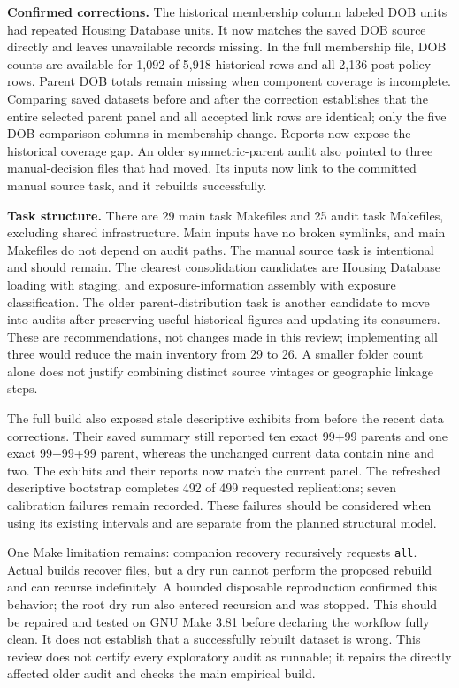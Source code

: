 \textbf{Confirmed corrections.} The historical membership column labeled DOB units had repeated Housing Database units. It now matches the saved DOB source directly and leaves unavailable records missing. In the full membership file, DOB counts are available for 1,092 of 5,918 historical rows and all 2,136 post-policy rows. Parent DOB totals remain missing when component coverage is incomplete. Comparing saved datasets before and after the correction establishes that the entire selected parent panel and all accepted link rows are identical; only the five DOB-comparison columns in membership change. Reports now expose the historical coverage gap. An older symmetric-parent audit also pointed to three manual-decision files that had moved. Its inputs now link to the committed manual source task, and it rebuilds successfully.

\textbf{Task structure.} There are 29 main task Makefiles and 25 audit task Makefiles, excluding shared infrastructure. Main inputs have no broken symlinks, and main Makefiles do not depend on audit paths. The manual source task is intentional and should remain. The clearest consolidation candidates are Housing Database loading with staging, and exposure-information assembly with exposure classification. The older parent-distribution task is another candidate to move into audits after preserving useful historical figures and updating its consumers. These are recommendations, not changes made in this review; implementing all three would reduce the main inventory from 29 to 26. A smaller folder count alone does not justify combining distinct source vintages or geographic linkage steps.

The full build also exposed stale descriptive exhibits from before the recent data corrections. Their saved summary still reported ten exact 99+99 parents and one exact 99+99+99 parent, whereas the unchanged current data contain nine and two. The exhibits and their reports now match the current panel. The refreshed descriptive bootstrap completes 492 of 499 requested replications; seven calibration failures remain recorded. These failures should be considered when using its existing intervals and are separate from the planned structural model.

One Make limitation remains: companion recovery recursively requests \texttt{all}. Actual builds recover files, but a dry run cannot perform the proposed rebuild and can recurse indefinitely. A bounded disposable reproduction confirmed this behavior; the root dry run also entered recursion and was stopped. This should be repaired and tested on GNU Make 3.81 before declaring the workflow fully clean. It does not establish that a successfully rebuilt dataset is wrong. This review does not certify every exploratory audit as runnable; it repairs the directly affected older audit and checks the main empirical build.

